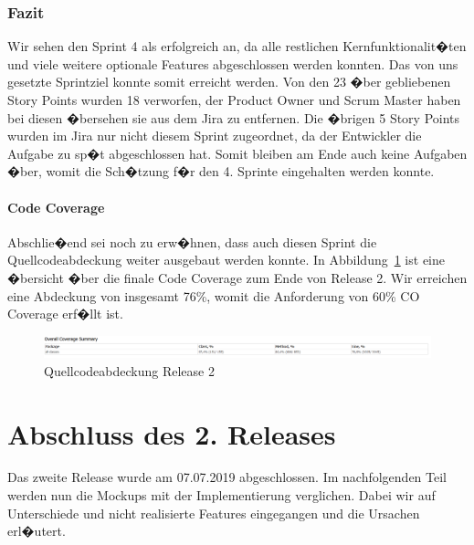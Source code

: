 \documentclass[12pt, titlepage]{scrartcl}
\newcommand{\Abb}[1]{%
	Abbildung\ \ref{#1}%
}
\begin{document}
			\subsubsection{Fazit}
			Wir sehen den Sprint 4 als erfolgreich an, da alle restlichen Kernfunktionalit�ten und viele weitere optionale Features abgeschlossen werden konnten. Das von uns gesetzte Sprintziel konnte somit erreicht werden. Von den 23 �ber gebliebenen Story Points wurden 18 verworfen, der Product Owner und Scrum Master haben bei diesen �bersehen sie aus dem Jira zu entfernen. Die �brigen 5 Story Points wurden im Jira nur nicht diesem Sprint zugeordnet, da der Entwickler die Aufgabe zu sp�t abgeschlossen hat. Somit bleiben am Ende auch keine Aufgaben �ber, womit die Sch�tzung f�r den 4. Sprinte eingehalten werden konnte.
			
			\paragraph{Code Coverage}
			Abschlie�end sei noch zu erw�hnen, dass auch diesen Sprint die Quellcodeabdeckung weiter ausgebaut werden konnte. In \Abb{CodeCoverageReleaseTwo} ist eine �bersicht �ber die finale Code Coverage zum Ende von Release 2. Wir erreichen eine Abdeckung von insgesamt 76\%, womit die Anforderung von 60\% CO Coverage erf�llt ist.
			
			\begin{figure}[H] 
				\centering
				\includegraphics[width=1\textwidth]{Coverage_Sprint_4.PNG}
				\caption{Quellcodeabdeckung Release 2}
				\label{CodeCoverageReleaseTwo}
			\end{figure}
			
			\section{Abschluss des 2. Releases}
			Das zweite Release wurde am 07.07.2019 abgeschlossen. Im nachfolgenden Teil werden nun die Mockups mit der Implementierung verglichen. Dabei wir auf Unterschiede und nicht realisierte Features eingegangen und die Ursachen erl�utert.
			
\end{document}
